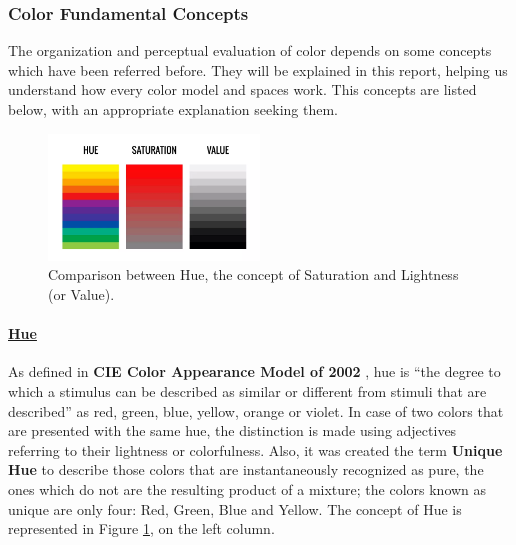 \subsubsection{Color Fundamental Concepts}
The organization and perceptual evaluation of color depends on some concepts which have been referred
before. They will be explained in this report, helping us understand how every color model and spaces work.
This concepts are listed below, with an appropriate explanation seeking them.
%
\begin{figure}[H]
  \centering
  \vspace{-10pt}
  \includegraphics[width=0.5\textwidth]{images/background/Hue_Saturation_value.png}
  \caption[Hue, Saturation and Value Comparison]{Comparison between Hue, the concept of Saturation and Lightness (or Value).\protect\footnotemark{}}
  \vspace{-25pt}
  \label{fig:hsvconcepts}
\end{figure}
%
\paragraph{\ul{Hue}} As defined in \textbf{CIE Color Appearance Model of 2002} \cite{Moroney2002}, hue is
“the degree to which a stimulus can be described as similar or different from stimuli that are described”
as red, green, blue, yellow, orange or violet. In case of two colors that are presented with the same hue, the
distinction is made using adjectives referring to their lightness or colorfulness. Also, it was created the
term \textbf{Unique Hue} to describe those colors that are instantaneously recognized as pure, the ones which do
not are the resulting product of a mixture; the colors known as unique are only four: Red, Green, Blue
and Yellow. The concept of Hue is represented in Figure \ref{fig:hsvconcepts}, on the left column.
%

